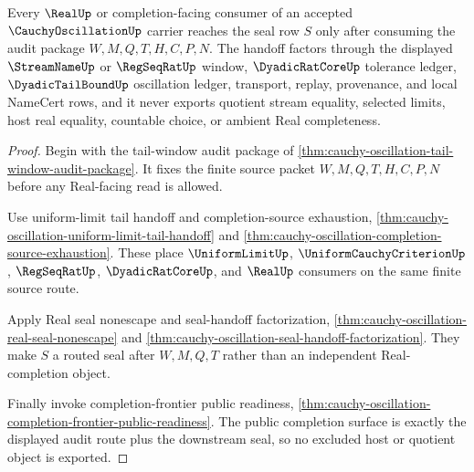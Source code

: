 \begin{theorem}
\label{thm:cauchy-oscillation-real-completion-audit-handoff}
Every $\RealUp$ or completion-facing consumer of an accepted $\CauchyOscillationUp$ carrier reaches the seal row $S$ only after consuming the audit package $W,M,Q,T,H,C,P,N$. The handoff factors through the displayed $\StreamNameUp$ or $\RegSeqRatUp$ window, $\DyadicRatCoreUp$ tolerance ledger, $\DyadicTailBoundUp$ oscillation ledger, transport, replay, provenance, and local NameCert rows, and it never exports quotient stream equality, selected limits, host real equality, countable choice, or ambient Real completeness.
\end{theorem}
\begin{proof}
Begin with the tail-window audit package of \autoref{thm:cauchy-oscillation-tail-window-audit-package}. It fixes the finite source packet $W,M,Q,T,H,C,P,N$ before any Real-facing read is allowed.

Use uniform-limit tail handoff and completion-source exhaustion, \autoref{thm:cauchy-oscillation-uniform-limit-tail-handoff} and \autoref{thm:cauchy-oscillation-completion-source-exhaustion}. These place $\UniformLimitUp$, $\UniformCauchyCriterionUp$, $\RegSeqRatUp$, $\DyadicRatCoreUp$, and $\RealUp$ consumers on the same finite source route.

Apply Real seal nonescape and seal-handoff factorization, \autoref{thm:cauchy-oscillation-real-seal-nonescape} and \autoref{thm:cauchy-oscillation-seal-handoff-factorization}. They make $S$ a routed seal after $W,M,Q,T$ rather than an independent Real-completion object.

Finally invoke completion-frontier public readiness, \autoref{thm:cauchy-oscillation-completion-frontier-public-readiness}. The public completion surface is exactly the displayed audit route plus the downstream seal, so no excluded host or quotient object is exported.
\end{proof}


